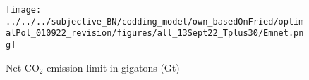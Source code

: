 % 



\begin{figure}
\caption{Net CO$_2$ emission limit in gigatons  (Gt)}\label{fig:emlimit}
\texttt{[image: ../../../subjective\_BN/codding\_model/own\_basedOnFried/optimalPol\_010922\_revision/figures/all\_13Sept22\_Tplus30/Emnet.png]}
\end{figure}


